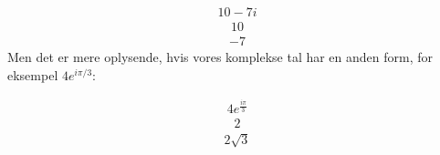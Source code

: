 \documentclass[letterpaper,10pt,english]{jupyterBook}
\begin{document}
\begin{sphinxVerbatim}[commandchars=\\\{\}]
      
\end{sphinxVerbatim}
\begin{equation*}
\begin{split}\displaystyle 10 - 7 i\end{split}
\end{equation*}\begin{equation*}
\begin{split}\displaystyle 10\end{split}
\end{equation*}\begin{equation*}
\begin{split}\displaystyle -7\end{split}
\end{equation*}
Men det er mere oplysende, hvis vores komplekse tal har en anden form, for eksempel \(4 e^{i \pi / 3}\):

\begin{sphinxVerbatim}[commandchars=\\\{\}]
        
\end{sphinxVerbatim}
\begin{equation*}
\begin{split}\displaystyle 4 e^{\frac{i \pi}{3}}\end{split}
\end{equation*}\begin{equation*}
\begin{split}\displaystyle 2\end{split}
\end{equation*}\begin{equation*}
\begin{split}\displaystyle 2 \sqrt{3}\end{split}
\end{equation*}
\end{document}
